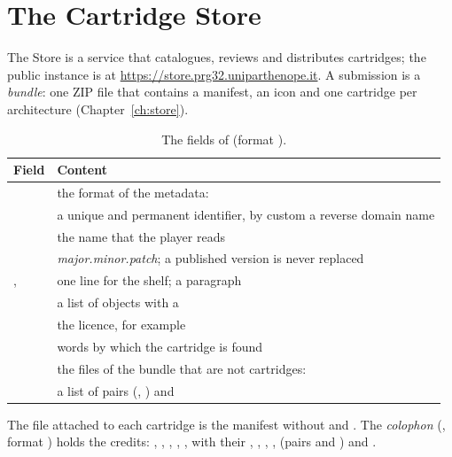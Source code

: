 \section{The Cartridge Store}

The Store is a service that catalogues, reviews and distributes cartridges;
the public instance is at \url{https://store.prg32.uniparthenope.it}. A
submission is a \emph{bundle}: one ZIP file that contains a manifest, an
icon and one cartridge per architecture (Chapter~\ref{ch:store}).

\begin{table}[htb]
\centering\small
\caption{The fields of  (format ).}\label{tab:prg:manifest}
\begin{tabularx}{\textwidth}{@{}lL@{}}
\toprule
\textbf{Field} & \textbf{Content}\\
\midrule
{} & the format of the metadata: \\
 & a unique and permanent identifier, by custom a reverse domain name\\
 & the name that the player reads\\
 & \emph{major.minor.patch}; a published version is never replaced\\
,  & one line for the shelf; a paragraph\\
 & a list of objects with a \\
 & the licence, for example \\
 & words by which the cartridge is found\\
 & the files of the bundle that are not cartridges: \\
 & a list of pairs  (, ) and \\
\bottomrule
\end{tabularx}
\end{table}

The file  attached to each cartridge is the manifest
without  and . The \emph{colophon}
(, format ) holds the credits:
, , , ,
,  with their , ,
, ,  (pairs
 and ) and .

